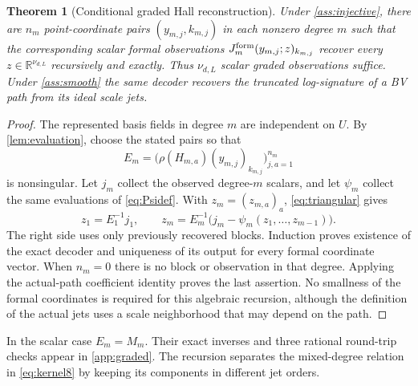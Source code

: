 \documentclass[11pt,a4paper]{article}
\numberwithin{equation}{section}
\newtheorem{theorem}{Theorem}[section]
\theoremstyle{definition}
\theoremstyle{remark}
\newcommand{\R}{\mathbb R}
\begin{document}
\begin{theorem}[Conditional graded Hall reconstruction]\label{thm:graded}
Under \cref{ass:injective}, there are $n_m$ point-coordinate pairs
$(y_{m,j},k_{m,j})$ in each nonzero degree $m$ such that the corresponding
scalar formal observations $J_m^{\rm form}(y_{m,j};z)_{k_{m,j}}$ recover
every $z\in\R^{\nu_{d,L}}$ recursively and exactly. Thus
$\nu_{d,L}$ scalar graded observations suffice. Under
\cref{ass:smooth} the same decoder recovers the truncated log-signature
of a BV path from its ideal scale jets.
\end{theorem}
\begin{proof}
The represented basis fields in degree $m$ are independent on $U$.
By \cref{lem:evaluation}, choose the stated pairs so that
\[
 E_m=\bigl(\rho(H_{m,a})(y_{m,j})_{k_{m,j}}\bigr)_{j,a=1}^{n_m}
\]
is nonsingular. Let $j_m$ collect the observed degree-$m$ scalars, and
let $\psi_m$ collect the same evaluations of \eqref{eq:Psidef}.
With $z_m=(z_{m,a})_a$, \eqref{eq:triangular} gives
\begin{equation}\label{eq:recursive}
 z_1=E_1^{-1}j_1,\qquad
 z_m=E_m^{-1}\bigl(j_m-\psi_m(z_1,\ldots,z_{m-1})\bigr).
\end{equation}
The right side uses only previously recovered blocks. Induction proves
existence of the exact decoder and uniqueness of its output for every
formal coordinate vector. When $n_m=0$ there is no block or observation
in that degree. Applying the actual-path coefficient identity proves the
last assertion. No smallness of the formal coordinates is required for
this algebraic recursion, although the definition of the actual jets uses
a scale neighborhood that may depend on the path.
\end{proof}

In the scalar case $E_m=M_m$. Their exact inverses and three rational
round-trip checks appear in \cref{app:graded}. The recursion separates the
mixed-degree relation in \eqref{eq:kernel8} by keeping its components in
different jet orders.
\end{document}
